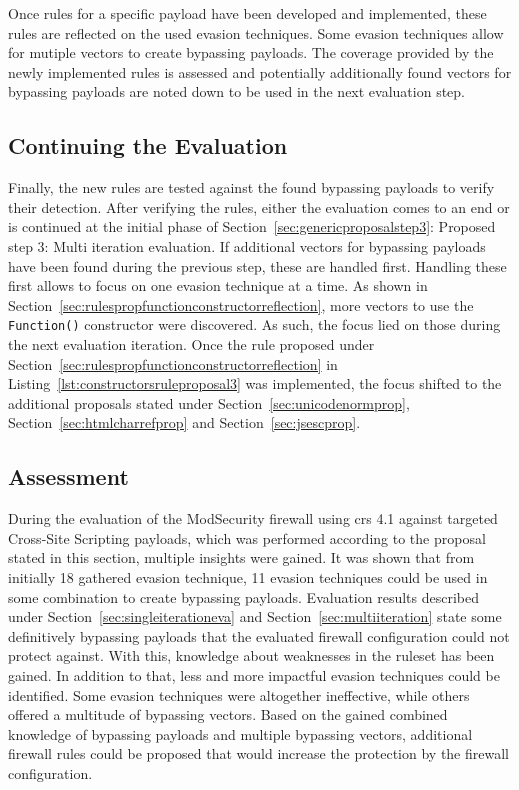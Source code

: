 Once rules for a specific payload have been developed and implemented, these rules are reflected on the used evasion techniques. Some evasion techniques allow for mutiple vectors to create bypassing payloads. The coverage provided by the newly implemented rules is assessed and potentially additionally found vectors for bypassing payloads are noted down to be used in the next evaluation step. 
\subsection{Continuing the Evaluation}
Finally, the new rules are tested against the found bypassing payloads to verify their detection. After verifying the rules, either the evaluation comes to an end or is continued at the initial phase of Section~\ref{sec:genericproposalstep3}: Proposed step 3: Multi iteration evaluation. If additional vectors for bypassing payloads have been found during the previous step, these are handled first. Handling these first allows to focus on one evasion technique at a time. As shown in Section~\ref{sec:rulespropfunctionconstructorreflection}, more vectors to use the \verb|Function()| constructor were discovered. As such, the focus lied on those during the next evaluation iteration. Once the rule proposed under Section~\ref{sec:rulespropfunctionconstructorreflection} in Listing~\ref{lst:constructorsruleproposal3} was implemented, the focus shifted to the additional proposals stated under Section~\ref{sec:unicodenormprop}, Section~\ref{sec:htmlcharrefprop} and Section~\ref{sec:jsescprop}.

\subsection{Assessment} 
During the evaluation of the ModSecurity firewall using \acrshort{crs} 4.1 against targeted Cross-Site Scripting payloads, which was performed according to the proposal stated in this section, multiple insights were gained.
It was shown that from initially 18 gathered evasion technique, 11 evasion techniques could be used in some combination to create bypassing payloads. Evaluation results described under Section~\ref{sec:singleiterationeva} and Section~\ref{sec:multiiteration} state some definitively bypassing payloads that the evaluated firewall configuration could not protect against. With this, knowledge about weaknesses in the ruleset has been gained.
In addition to that, less and more impactful evasion techniques could be identified. Some evasion techniques were altogether ineffective, while others offered a multitude of bypassing vectors. Based on the gained combined knowledge of bypassing payloads and multiple bypassing vectors, additional firewall rules could be proposed that would increase the protection by the firewall configuration.

